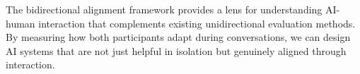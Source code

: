 The bidirectional alignment framework provides a lens for understanding AI-human interaction that complements existing unidirectional evaluation methods. By measuring how both participants adapt during conversations, we can design AI systems that are not just helpful in isolation but genuinely aligned through interaction.
